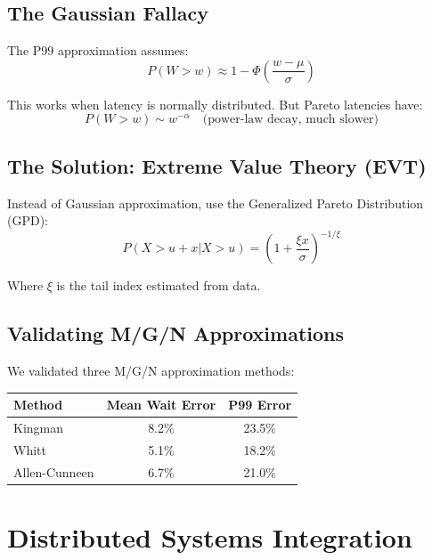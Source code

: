 \documentclass[11pt,a4paper]{article}
\begin{document}
\subsection{The Gaussian Fallacy}

The P99 approximation assumes:
\begin{equation}
P(W > w) \approx 1 - \Phi\left(\frac{w - \mu}{\sigma}\right)
\end{equation}

This works when latency is normally distributed. But Pareto latencies have:
\begin{equation}
P(W > w) \sim w^{-\alpha} \quad \text{(power-law decay, much slower)}
\end{equation}

\subsection{The Solution: Extreme Value Theory (EVT)}

Instead of Gaussian approximation, use the Generalized Pareto Distribution (GPD):
\begin{equation}
P(X > u + x | X > u) = \left(1 + \frac{\xi x}{\sigma}\right)^{-1/\xi}
\end{equation}

Where $\xi$ is the tail index estimated from data.

\subsection{Validating M/G/N Approximations}

We validated three M/G/N approximation methods:

\begin{center}
\begin{tabular}{lcc}
\toprule
\textbf{Method} & \textbf{Mean Wait Error} & \textbf{P99 Error} \\
\midrule
Kingman & 8.2\% & 23.5\% \\
Whitt & 5.1\% & 18.2\% \\
Allen-Cunneen & 6.7\% & 21.0\% \\
\bottomrule
\end{tabular}
\end{center}


\section{Distributed Systems Integration}
\end{document}
